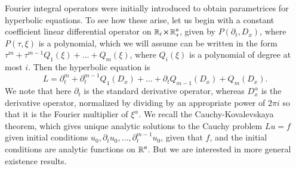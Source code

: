 Fourier integral operators were initially introduced to obtain parametrices for hyperbolic equations. To see how these arise, let us begin with a constant coefficient linear differential operator on $\operatorname{\mathbb{R}}_t \times \operatorname{\mathbb{R}}^n_x$, given by $P(\partial_t, D_x)$, where $P(\tau, \xi)$ is a polynomial, which we will assume can be written in the form $\tau^m + \tau^{m-1} Q_1(\xi) + \dots + Q_m(\xi)$, where $Q_i(\xi)$ is a polynomial of degree at most $i$. Then the hyperbolic equation is
%
\[ L = \partial_t^m + \partial_t^{m-1} Q_1(D_x) + \dots + \partial_t Q_{m-1}(D_x) + Q_m(D_x). \]
%
We note that here $\partial_t$ is the standard derivative operator, whereas $D_x^\alpha$ is the derivative operator, normalized by dividing by an appropriate power of $2 \pi i$ so that it is the Fourier multiplier of $\xi^\alpha$. We recall the Cauchy-Kovalevskaya theorem, which gives unique analytic solutions to the Cauchy problem $Lu = f$ given initial conditions $u_0,\partial_t u_0, \dots, \partial_t^{m-1} u_0$, given that $f$, and the initial conditions are analytic functions on $\operatorname{\mathbb{R}}^n$. But we are interested in more general existence results.


% 


%
% 
%
% 
% 

%

